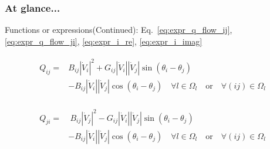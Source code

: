 \documentclass[
	11pt, %
	aspectratio=169, %
]{beamer}
\begin{document}
\begin{frame}
	\frametitle{At glance...}
	
	Functions or expressions(Continued): Eq.~\eqref{eq:expr_q_flow_ij}, \eqref{eq:expr_q_flow_ji}, \eqref{eq:expr_i_re}, \eqref{eq:expr_i_imag}
	
	\begin{align*}
		\begin{split}
			Q_{ij}=&B_{ij}\left\lvert \dot{V}_{i}\right\rvert^{2} + G_{ij}\left\lvert \dot{V}_{i}\right\rvert\left\lvert \dot{V}_{j}\right\rvert \sin{\left(\theta_{i}-\theta_{j}\right)} \\
			&- B_{ij}\left\lvert \dot{V}_{i}\right\rvert\left\lvert \dot{V}_{j}\right\rvert \cos{\left(\theta_{i}-\theta_{j}\right)}  \quad   \forall l \in \Omega_{l} \quad \text{or} \quad \forall (ij) \in \Omega_{l}
		\end{split}
	\end{align*}

	\begin{align*}
		\begin{split}
			Q_{ji} =&\ B_{ij}\left\lvert \dot{V}_{j}\right\rvert^{2} - G_{ij}\left\lvert \dot{V}_{i}\right\rvert\left\lvert \dot{V}_{j}\right\rvert \sin{\left(\theta_{i}-\theta_{j}\right)} \\
			&- B_{ij}\left\lvert \dot{V}_{i}\right\rvert\left\lvert \dot{V}_{j}\right\rvert \cos{\left(\theta_{i}-\theta_{j}\right)}  \quad   \forall l \in \Omega_{l} \quad \text{or} \quad \forall (ij) \in \Omega_{l}
		\end{split}
	\end{align*}


\end{frame}

\end{document}
